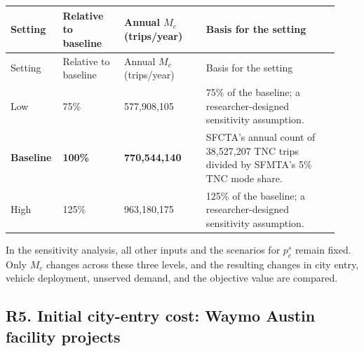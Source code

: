 \documentclass[10pt,a4paper]{article}
\begin{document}
\begingroup
\small
\setlength{\tabcolsep}{4pt}
\renewcommand{\arraystretch}{1.2}
\begin{longtable}{@{}
P{0.12\linewidth}
P{0.18\linewidth}
P{0.24\linewidth}
P{0.39\linewidth}
@{}}
\toprule
Setting
& Relative to baseline
& Annual $M_c$ \newline (trips/year)
& Basis for the setting \\
\midrule
\endfirsthead
\toprule
Setting
& Relative to baseline
& Annual $M_c$ \newline (trips/year)
& Basis for the setting \\
\midrule
\endhead

Low
& 75\%
& 577,908,105
& 75\% of the baseline; a researcher-designed sensitivity assumption. \\
\addlinespace

\textbf{Baseline}
& \textbf{100\%}
& \textbf{770,544,140}
& SFCTA's annual count of 38,527,207 TNC trips divided by SFMTA's 5\% TNC mode share. \\
\addlinespace

High
& 125\%
& 963,180,175
& 125\% of the baseline; a researcher-designed sensitivity assumption. \\
\bottomrule
\end{longtable}
\endgroup

\noindent
In the sensitivity analysis, all other inputs and the scenarios for $p_c^s$ remain fixed. Only $M_c$ changes across these three levels, and the resulting changes in city entry, vehicle deployment, unserved demand, and the objective value are compared.


\subsection*{\hypertarget{rationale-R5}{R5. Initial city-entry cost: Waymo Austin facility projects}}
\end{document}
